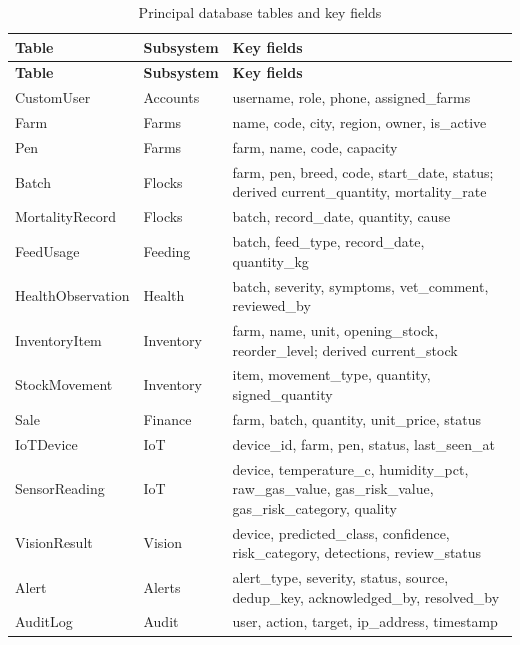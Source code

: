 \documentclass[12pt,a4paper]{report}
\begin{document}
\begin{longtable}{@{}p{3.2cm} p{2.0cm} p{8.3cm}@{}}
\caption{Principal database tables and key fields}\label{tab:dbdict}\\
\toprule
\textbf{Table} & \textbf{Subsystem} & \textbf{Key fields} \\
\midrule
\endfirsthead
\toprule \textbf{Table} & \textbf{Subsystem} & \textbf{Key fields} \\ \midrule \endhead
\bottomrule \endfoot
CustomUser & Accounts & username, role, phone, assigned\_farms \\
Farm & Farms & name, code, city, region, owner, is\_active \\
Pen & Farms & farm, name, code, capacity \\
Batch & Flocks & farm, pen, breed, code, start\_date, status; derived current\_quantity, mortality\_rate \\
MortalityRecord & Flocks & batch, record\_date, quantity, cause \\
FeedUsage & Feeding & batch, feed\_type, record\_date, quantity\_kg \\
HealthObservation & Health & batch, severity, symptoms, vet\_comment, reviewed\_by \\
InventoryItem & Inventory & farm, name, unit, opening\_stock, reorder\_level; derived current\_stock \\
StockMovement & Inventory & item, movement\_type, quantity, signed\_quantity \\
Sale & Finance & farm, batch, quantity, unit\_price, status \\
IoTDevice & IoT & device\_id, farm, pen, status, last\_seen\_at \\
SensorReading & IoT & device, temperature\_c, humidity\_pct, raw\_gas\_value, gas\_risk\_value, gas\_risk\_category, quality \\
VisionResult & Vision & device, predicted\_class, confidence, risk\_category, detections, review\_status \\
Alert & Alerts & alert\_type, severity, status, source, dedup\_key, acknowledged\_by, resolved\_by \\
AuditLog & Audit & user, action, target, ip\_address, timestamp \\
\end{longtable}

\clearpage


\setcounter{table}{0}
\setcounter{figure}{0}
\renewcommand{\thetable}{F.\arabic{table}}
\renewcommand{\thefigure}{F.\arabic{figure}}
\end{document}
